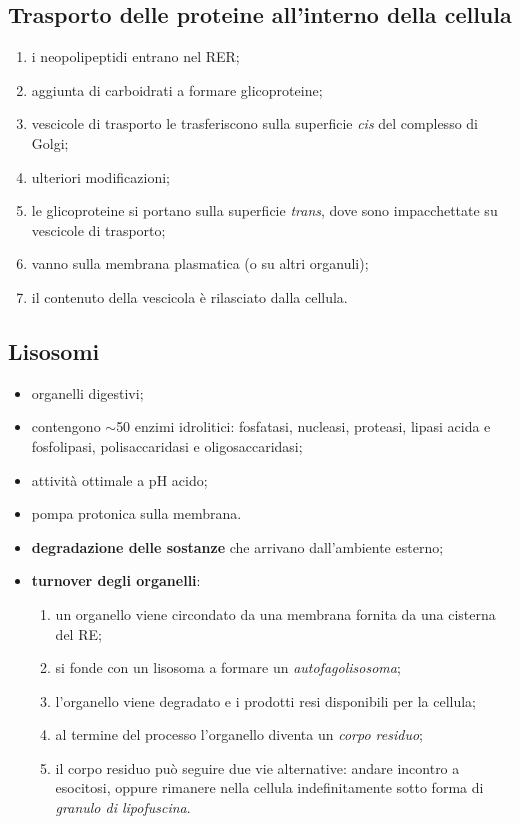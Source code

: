 \subsection{Trasporto delle proteine all'interno della cellula}

\begin{enumerate}
  \item i neopolipeptidi entrano nel RER;
  \item aggiunta di carboidrati a formare glicoproteine;
  \item vescicole di trasporto le trasferiscono sulla superficie \textit{cis} del complesso di Golgi;
  \item ulteriori modificazioni;
  \item le glicoproteine si portano sulla superficie \textit{trans}, dove sono impacchettate su vescicole di trasporto;
  \item vanno sulla membrana plasmatica (o su altri organuli);
  \item il contenuto della vescicola è rilasciato dalla cellula.
\end{enumerate}

\subsection{Lisosomi}

\begin{itemize}
  \item organelli digestivi;
  \item contengono $\sim$50 enzimi idrolitici: fosfatasi, nucleasi, proteasi, lipasi acida e fosfolipasi, polisaccaridasi e oligosaccaridasi;
  \item attività ottimale a pH acido;
  \item pompa protonica sulla membrana.
\end{itemize}

\begin{itemize}
  \item \textbf{degradazione delle sostanze} che arrivano dall'ambiente esterno;
  \item \textbf{turnover degli organelli}:
    \begin{enumerate}
      \item un organello viene circondato da una membrana fornita da una cisterna del RE;
      \item si fonde con un lisosoma a formare un \textit{autofagolisosoma};
      \item l'organello viene degradato e i prodotti resi disponibili per la cellula;
      \item al termine del processo l'organello diventa un \textit{corpo residuo};
      \item il corpo residuo può seguire due vie alternative: andare incontro a esocitosi, oppure rimanere nella cellula indefinitamente sotto forma di \textit{granulo di lipofuscina}.
    \end{enumerate}
\end{itemize}

